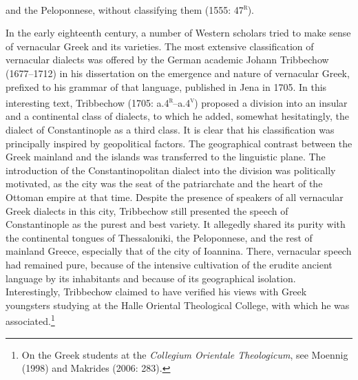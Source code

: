 \begin{styleStandard}
and the Peloponnese, without classifying them (1555: 47\textsc{\textsuperscript{r}}).
\end{styleStandard}

\begin{styleStandard}
In the early eighteenth century, a number of Western scholars tried to make sense of vernacular Greek and its varieties. The most extensive classification of vernacular dialects was offered by the German academic Johann Tribbechow (1677–1712) in his dissertation on the emergence and nature of vernacular Greek, prefixed to his grammar of that language, published in Jena in 1705. In this interesting text, Tribbechow (1705: a.4\textsc{\textsuperscript{r}}\textsc{–}a.4\textsc{\textsuperscript{v}}) proposed a division into an insular and a continental class of dialects, to which he added, somewhat hesitatingly, the dialect of Constantinople as a third class. It is clear that his classification was principally inspired by geopolitical factors. The geographical contrast between the Greek mainland and the islands was transferred to the linguistic plane. The introduction of the Constantinopolitan dialect into the division was politically motivated, as the city was the seat of the patriarchate and the heart of the Ottoman empire at that time. Despite the presence of speakers of all vernacular Greek dialects in this city, Tribbechow still presented the speech of Constantinople as the purest and best variety. It allegedly shared its purity with the continental tongues of Thessaloniki, the Peloponnese, and the rest of mainland Greece, especially that of the city of Ioannina. There, vernacular speech had remained pure, because of the intensive cultivation of the erudite ancient language by its inhabitants and because of its geographical isolation. Interestingly, Tribbechow claimed to have verified his views with Greek youngsters studying at the Halle Oriental Theological College, with which he was associated.\footnote{ On the Greek students at the \textit{Collegium Orientale Theologicum}, see Moennig (1998) and Makrides (2006: 283).}
\end{styleStandard}

